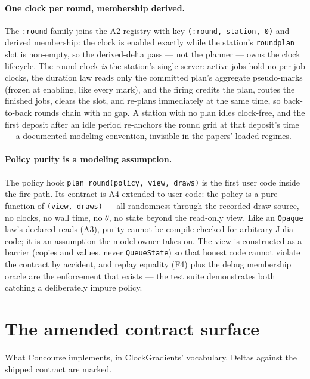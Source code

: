 \documentclass[11pt]{article}
\newcommand{\code}[1]{\texttt{#1}}
\begin{document}
\paragraph{One clock per round, membership derived.} The \code{:round}
family joins the A2 registry with key
\code{(:round, station, 0)} and derived membership: the clock is enabled
exactly while the station's \code{roundplan} slot is non-empty, so the
derived-delta pass --- not the planner --- owns the clock lifecycle. The
round clock \emph{is} the station's single server: active jobs hold no
per-job clocks, the duration law reads only the committed plan's
aggregate pseudo-marks (frozen at enabling, like every mark), and the
firing credits the plan, routes the finished jobs, clears the slot, and
re-plans immediately at the same time, so back-to-back rounds chain with
no gap. A station with no plan idles clock-free, and the first deposit
after an idle period re-anchors the round grid at that deposit's time ---
a documented modeling convention, invisible in the papers' loaded
regimes.

\paragraph{Policy purity is a modeling assumption.} The policy hook
\code{plan\_round(policy, view, draws)} is the first user code inside the
fire path. Its contract is A4 extended to user code: the policy is a pure
function of \code{(view, draws)} --- all randomness through the recorded
draw source, no clocks, no wall time, no $\theta$, no state beyond the
read-only view. Like an \code{Opaque} law's declared reads (A3), purity
cannot be compile-checked for arbitrary Julia code; it is an assumption
the model owner takes on. The view is constructed as a barrier (copies
and values, never \code{QueueState}) so that honest code cannot violate
the contract by accident, and replay equality (F4) plus the debug
membership oracle are the enforcement that exists --- the test suite
demonstrates both catching a deliberately impure policy.

\section{The amended contract surface}
\label{sec:contract}

What Concourse implements, in ClockGradients' vocabulary. Deltas against the
shipped contract are marked.
\end{document}

